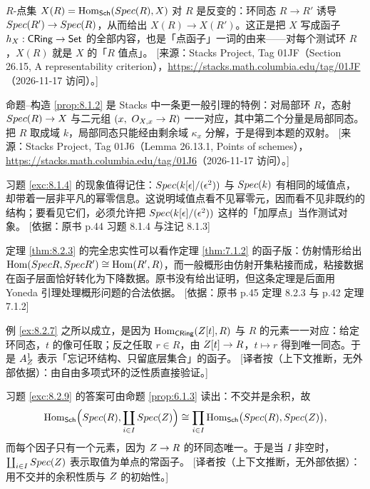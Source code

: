 \begin{yizhu}
$R$-点集 $X(R)=\operatorname{Hom}_{\mathsf{Sch}}(Spec(R),X)$ 对 $R$ 是反变的：环同态 $R\to R'$ 诱导 $Spec(R')\to Spec(R)$，从而给出 $X(R)\to X(R')$。这正是把 $X$ 写成函子 $h_X:\mathsf{CRing}\to\mathsf{Set}$ 的全部内容，也是「点函子」一词的由来——对每个测试环 $R$，$X(R)$ 就是 $X$ 的「$R$ 值点」。
[来源：Stacks Project, Tag 01JF（Section 26.15, A representability criterion），\url{https://stacks.math.columbia.edu/tag/01JF}（2026-11-17 访问）。]
\end{yizhu}

\begin{yizhu}
命题--构造 \ref{prop:8.1.2} 是 Stacks 中一条更一般引理的特例：对局部环 $R$，态射 $Spec(R)\to X$ 与二元组 $(x,\ O_{X,x}\to R)$ 一一对应，其中第二个分量是局部同态。把 $R$ 取成域 $k$，局部同态只能经由剩余域 $\kappa_x$ 分解，于是得到本题的双射。
[来源：Stacks Project, Tag 01J6（Lemma 26.13.1, Points of schemes），\url{https://stacks.math.columbia.edu/tag/01J6}（2026-11-17 访问）。]
\end{yizhu}

\begin{yizhu}
习题 \ref{exc:8.1.4} 的现象值得记住：$Spec(k[\epsilon]/(\epsilon^2))$ 与 $Spec(k)$ 有相同的域值点，却带着一层非平凡的幂零信息。这说明域值点看不见幂零元，因而看不见非既约的结构；要看见它们，必须允许把 $Spec(k[\epsilon]/(\epsilon^2))$ 这样的「加厚点」当作测试对象。
[依据：原书 p.44 习题 8.1.4 与注记 8.1.3]
\end{yizhu}

\begin{yizhu}
定理 \ref{thm:8.2.3} 的完全忠实性可以看作定理 \ref{thm:7.1.2} 的函子版：仿射情形给出 $\operatorname{Hom}(Spec R,Spec R')\cong\operatorname{Hom}(R',R)$，而一般概形由仿射开集粘接而成，粘接数据在函子层面恰好转化为下降数据。原书没有给出证明，但这条定理是后面用 Yoneda 引理处理概形问题的合法依据。
[依据：原书 p.45 定理 8.2.3 与 p.42 定理 7.1.2]
\end{yizhu}

\begin{yizhu}
例 \ref{ex:8.2.7} 之所以成立，是因为 $\operatorname{Hom}_{\mathsf{CRing}}(Z[t],R)$ 与 $R$ 的元素一一对应：给定环同态，$t$ 的像可任取；反之任取 $r\in R$，由 $Z[t]\to R$，$t\mapsto r$ 得到唯一同态。于是 $A^1_Z$ 表示「忘记环结构、只留底层集合」的函子。
[译者按（上下文推断，无外部依据）：由自由多项式环的泛性质直接验证。]
\end{yizhu}

\begin{yizhu}
习题 \ref{exc:8.2.9} 的答案可由命题 \ref{prop:6.1.3} 读出：不交并是余积，故
\[
\operatorname{Hom}_{\mathsf{Sch}}\Bigl(Spec(R),\coprod_{i\in I}Spec(Z)\Bigr)\cong\prod_{i\in I}\operatorname{Hom}_{\mathsf{Sch}}\bigl(Spec(R),Spec(Z)\bigr),
\]
而每个因子只有一个元素，因为 $Z\to R$ 的环同态唯一。于是当 $I$ 非空时，$\coprod_{i\in I}Spec(Z)$ 表示取值为单点的常函子。
[译者按（上下文推断，无外部依据）：用不交并的余积性质与 $Z$ 的初始性。]
\end{yizhu}
